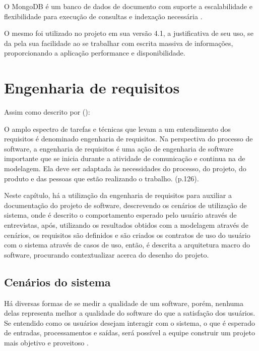 O MongoDB é um banco de dados de documento com suporte a escalabilidade e flexibilidade para execução de consultas e indexação necessária \cite{what_mongodb}.

O mesmo foi utilizado no projeto em sua versão 4.1, a justificativa de seu uso, se da pela sua facilidade ao se trabalhar com escrita massiva de informações, proporcionando a aplicação performance e disponibilidade.

\chapter{Engenharia de requisitos}

Assim como descrito por  (\citeyear{engenharia_software_pressman}):

\begin{citacao}
O amplo espectro de tarefas e técnicas que levam a um entendimento dos requisitos é denominado engenharia de requisitos. Na perspectiva do processo de software, a engenharia de requisitos é uma ação de engenharia de software importante que se inicia durante a atividade de comunicação e continua na de modelagem. Ela deve ser adaptada às necessidades do processo, do projeto, do produto e das pessoas que estão realizando o trabalho. (p.126).
\end{citacao}

Neste capítulo, há a utilização da engenharia de requisitos para auxiliar a documentação do projeto de software, descrevendo os cenários de utilização de sistema, onde é descrito o comportamento esperado pelo usuário através de entrevistas, após, utilizando os resultados obtidos com a modelagem através de cenários, os requisitos são definidos e são criados os contratos de uso do usuário com o sistema através de casos de uso, então, é descrita a arquitetura macro do software, procurando contextualizar acerca do desenho do projeto.

\section{Cenários do sistema}

Há diversas formas de se medir a qualidade de um software, porém, nenhuma delas representa melhor a qualidade do software do que a satisfação dos usuários. Se entendido como os usuários desejam interagir com o sistema, o que é esperado de entradas, processamentos e saídas, será possível a equipe construir um projeto mais objetivo e proveitoso \cite{engenharia_software_pressman}. 

